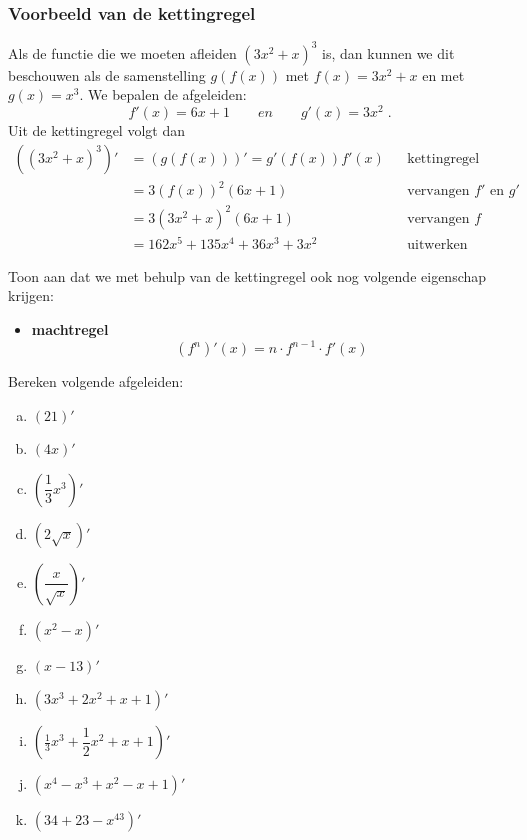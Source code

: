 \documentclass[a4paper,12pt,twoside]{article}
\begin{document}
\subsubsection*{Voorbeeld van de kettingregel}

Als de functie die we moeten afleiden $(3x^2+x)^3$ is, dan kunnen we dit beschouwen als de samenstelling $g(f(x))$ met $f(x)=3x^2+x$ en met $g(x)=x^3$. We bepalen de afgeleiden:
$$f'(x)=6x+1 \qquad en \qquad g'(x)=3x^2\;.$$
Uit de kettingregel volgt dan
\begin{align*}
  \left((3x^2+x)^3\right)' & =\left(g\left(f\left(x\right)\right)\right)' =g'(f(x)) f'(x) &&\mbox{kettingregel}\\
                           & =3(f(x))^2 (6x+1) &&\mbox{vervangen $f'$ en $g'$}\\
                           & = 3(3x^2+x)^2(6x+1) &&\mbox{vervangen $f$}\\
                           & = 162x^5 + 135x^4 + 36x^3 + 3x^2 &&\mbox{uitwerken}
\end{align*}

\begin{oefening}
  Toon aan dat we met behulp van de kettingregel ook nog volgende eigenschap krijgen:
  \begin{mdframed}
    \begin{itemize}
    \item {\bf machtregel}
      $$(f^n)'(x)=n\cdot f^{n-1} \cdot f'(x)$$
    \end{itemize}
  \end{mdframed}
\end{oefening}

\begin{oefening}
  Bereken volgende afgeleiden:
  \begin{multicols}{2}
    \begin{enumerate}[(a)]
      \itemsep1em
    \item $\left(21\right)'$
    \item $\left(4x\right)'$
    \item $\left(\dfrac{1}{3}x^3\right)'$
    \item $\left(2\sqrt{x}\right)'$
    \item $\left(\dfrac{x}{\sqrt{x}}\right)'$
    \item $\left(x^2-x\right)'$
    \item $\left(x-13\right)'$
    \item $\left(3x^3+2x^2+x+1\right)'$
    \item $\left(\frac{1}{3}x^3+\dfrac{1}{2}x^2+x+1\right)'$
    \item $\left(x^4-x^3+x^2-x+1\right)'$
    \item $\left(34+23-x^{43}\right)'$
    \end{enumerate}
  \end{multicols}
\end{oefening}
\end{document}
